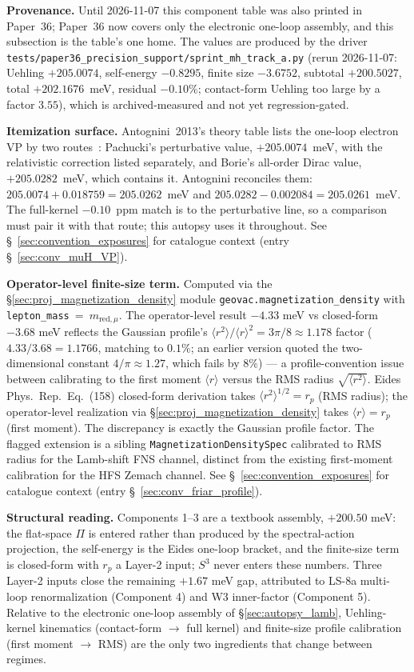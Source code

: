 \documentclass[11pt]{article}
\begin{document}
\textbf{Provenance.}  Until 2026-11-07 this component table was also
printed in Paper~36; Paper~36 now covers only the electronic one-loop
assembly, and this subsection is the table's one home.  The values are
produced by the driver
\texttt{tests/paper36\_precision\_support/sprint\_mh\_track\_a.py}
(rerun 2026-11-07: Uehling $+205.0074$, self-energy $-0.8295$, finite size
$-3.6752$, subtotal $+200.5027$, total $+202.1676$~meV, residual
$-0.10\%$; contact-form Uehling too large by a factor $3.55$), which is
archived-measured and not yet regression-gated.

\textbf{Itemization surface.}  Antognini~2013's theory table lists the
one-loop electron VP by two routes~\cite{antognini2013_theory}:
Pachucki's perturbative value, $+205.0074$~meV, with the relativistic
correction listed separately, and Borie's all-order Dirac value,
$+205.0282$~meV, which contains it.  Antognini reconciles them:
$205.0074 + 0.018759 = 205.0262$~meV and $205.0282 - 0.002084 =
205.0261$~meV.  The full-kernel $-0.10$~ppm match is to the perturbative
line, so a comparison must pair it with that route; this autopsy uses
it throughout.  See
\S~\ref{sec:convention_exposures} for catalogue context (entry
\S~\ref{sec:conv_muH_VP}).

\textbf{Operator-level finite-size term.}  Computed via the
\S\ref{sec:proj_magnetization_density} module
\texttt{geovac.magnetization\_density} with
\texttt{lepton\_mass}~=~$m_{\text{red},\mu}$.  The operator-level
result $-4.33$ meV vs closed-form $-3.68$ meV reflects the Gaussian
profile's $\langle r^2\rangle / \langle r\rangle^2 = 3\pi/8 \approx
1.178$ factor ($4.33/3.68 = 1.1766$, matching to $0.1\%$; an earlier
version quoted the two-dimensional constant $4/\pi \approx 1.27$,
which fails by $8\%$) --- a profile-convention issue between calibrating to
the first moment $\langle r\rangle$ versus the RMS radius
$\sqrt{\langle r^2\rangle}$.  Eides Phys.\ Rep.\ Eq.~(158) closed-form derivation
takes $\langle r^2\rangle^{1/2} = r_p$ (RMS radius); the operator-level
realization via \S\ref{sec:proj_magnetization_density} takes
$\langle r\rangle = r_p$ (first moment).  The discrepancy is exactly
the Gaussian profile factor.  The flagged extension is a sibling
\texttt{MagnetizationDensitySpec} calibrated to RMS radius for the
Lamb-shift FNS channel, distinct from the existing first-moment
calibration for the HFS Zemach channel.  See
\S~\ref{sec:convention_exposures} for catalogue context (entry
\S~\ref{sec:conv_friar_profile}).

\textbf{Structural reading.}  Components 1--3 are a textbook
assembly, $+200.50$ meV: the flat-space $\Pi$ is entered rather than
produced by the spectral-action projection, the self-energy is the
Eides one-loop bracket, and the finite-size term is closed-form with $r_p$ a
Layer-2 input; $S^3$ never enters these numbers.  Three Layer-2 inputs
close the remaining $+1.67$ meV gap, attributed to LS-8a
multi-loop renormalization (Component 4) and W3 inner-factor
(Component 5).  Relative to the electronic one-loop assembly of
\S\ref{sec:autopsy_lamb}, Uehling-kernel kinematics (contact-form
$\to$ full kernel) and finite-size profile calibration (first moment $\to$
RMS) are the only two ingredients that change between regimes.
\end{document}
